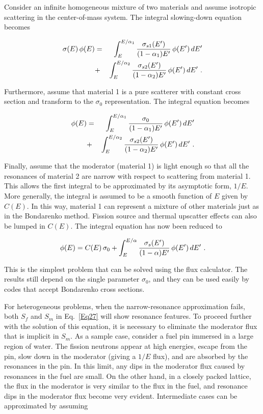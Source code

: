 Consider an infinite homogeneous mixture of two materials and assume
isotropic scattering in the center-of-mass system.  The integral
slowing-down equation becomes

  \begin{eqnarray}
    \sigma(E)\,\phi(E)&=&\int_E^{E/\alpha_1}{{\sigma_{s1}(E')}\over
    {(1-\alpha_1)E'}}\,\phi(E')\,dE'\nonumber\\
    &+&\int_E^{E/\alpha_2}{{\sigma_{s2}(E')}\over
    {(1-\alpha_2)E'}}\,\phi(E')\,dE'\,\,.
  \end{eqnarray}

\noindent
Furthermore, assume that material 1 is a pure scatterer with constant
cross section and transform to the $\sigma_0$ representation.  The
integral equation becomes

  \begin{eqnarray}
    [\sigma_0+\sigma_{t2}(E)]\,\phi(E)&=&
    \int_E^{E/\alpha_1}{{\sigma_0}\over
    {(1-\alpha_1)E'}}\,\phi(E')\,dE'\nonumber\\
    &+&\int_E^{E/\alpha_2}{{\sigma_{s2}(E')}\over
    {(1-\alpha_2)E'}}\,\phi(E')\,dE'\,\,.
  \end{eqnarray}

\noindent
Finally, assume that the moderator (material 1) is light enough so that
all the resonances of material 2 are narrow with respect to scattering
from material 1.  This allows the first integral to be approximated by
its asymptotic form, $1/E$.  More generally, the integral is assumed to
be a smooth function of $E$ given by $C(E)$.  In this way, material 1
can represent a mixture of other materials just as in the Bondarenko
method.  Fission source and thermal upscatter effects can also be lumped
in $C(E)$.  The integral equation has now been reduced to

  \begin{equation}
    [\sigma_0+\sigma_t(E)]\,\phi(E)={C(E)\,\sigma_0}
    +\int_E^{E/\alpha}{{\sigma_s(E')}\over
    {(1-\alpha)E'}}\,\phi(E')\,dE'\,\,.
  \label{Eq33}
  \end{equation}

\noindent
This is the simplest problem that can be solved using the flux calculator.
The results still depend on the single parameter $\sigma_0$, and they
can be used easily by codes that accept Bondarenko cross sections.

For heterogeneous problems, when the narrow-resonance approximation
fails, both $S_f$ and $S_m$ in Eq.~\ref{Eq27} will show resonance features.
To proceed further with the solution of this equation, it is necessary
to eliminate the moderator flux that is implicit in $S_m$.  As
a sample case, consider a fuel pin immersed in a large region of
water.  The fission neutrons appear at high energies, escape from the
pin, slow down in the moderator (giving a $1/E$ flux), and are absorbed
by the resonances in the pin.  In this limit, any dips in the moderator
flux caused by resonances in the fuel are small.  On the other hand, in
a closely packed lattice, the flux in the moderator is very similar to
the flux in the fuel, and resonance dips in the moderator flux become
very evident.  Intermediate cases can be approximated\cite{ref9} by assuming

